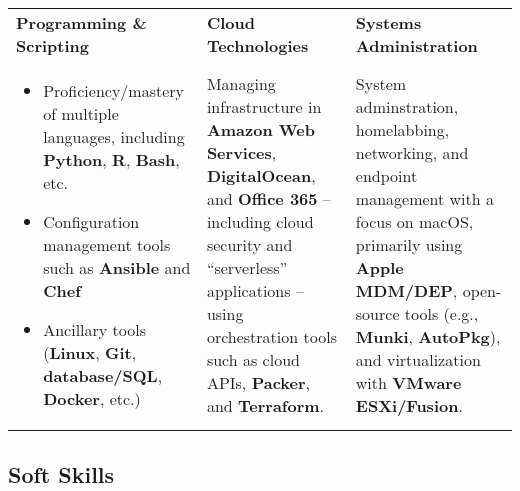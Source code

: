\documentclass[10pt]{article}
\newcommand{\afterlistspace}[0]{\vspace{-1.5em}}
\begin{document}
\begin{tabularx}{\linewidth}{
    >{\hsize=1\hsize}X|%
    >{\hsize=1\hsize}X|%
    >{\hsize=1\hsize}X%
  }
    \textbf{Programming \& Scripting}
    & \textbf{Cloud Technologies}
    & \textbf{Systems Administration}
    \\
    \begin{itemize}[noitemsep,topsep=0pt]
        \vspace{-0.75em}

        \item Proficiency/mastery of multiple languages, including \textbf{Python}, \textbf{R}, \textbf{Bash}, %
        etc.

        \item Configuration management tools such as \textbf{Ansible} and \textbf{Chef}

        \item Ancillary tools (\textbf{Linux}, \textbf{Git}, \textbf{database/SQL}, \textbf{Docker}, etc.)
        
        \afterlistspace
    \end{itemize}

    & Managing infrastructure in \textbf{Amazon Web Services}, \textbf{DigitalOcean}, and \textbf{Office 365} -- including cloud security and ``serverless'' applications -- using orchestration tools such as cloud APIs, \textbf{Packer}, and \textbf{Terraform}.

    & %

    System adminstration, homelabbing, networking, and endpoint management with a focus on macOS, primarily using \textbf{Apple MDM/DEP}, open-source tools (e.g., \textbf{Munki}, \textbf{AutoPkg}), and virtualization with \textbf{VMware ESXi/Fusion}.
    
\end{tabularx}


\subsection{Soft Skills}
\end{document}

